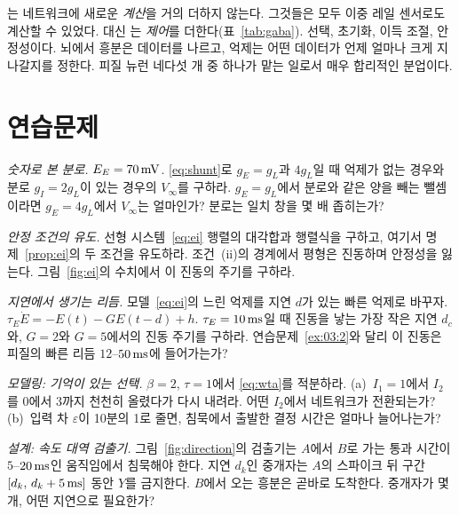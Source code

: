 는 네트워크에 새로운 \emph{계산}을 거의 더하지 않는다. 그것들은 모두 이중 레일 센서로도 계산할 수 있었다. 대신 는 \emph{제어}를 더한다(표~\ref{tab:gaba}). 선택, 초기화, 이득 조절, 안정성이다. 뇌에서 흥분은 데이터를 나르고, 억제는 어떤 데이터가 언제 얼마나 크게 지나갈지를 정한다. 피질 뉴런 네다섯 개 중 하나가 맡는 일로서 매우 합리적인 분업이다.

\section{연습문제}

\begin{exercise}[\lvlA]
\label{ex:03:1}
\emph{숫자로 본 분로.} $E_E=70\,\text{mV}$. \eqref{eq:shunt}로 $g_E=g_L$과 $4g_L$일 때 억제가 없는 경우와 분로 $g_I=2g_L$이 있는 경우의 $V_\infty$를 구하라. $g_E=g_L$에서 분로와 같은 양을 빼는 뺄셈이라면 $g_E=4g_L$에서 $V_\infty$는 얼마인가? 분로는 일치 창을 몇 배 좁히는가?
\end{exercise}

\begin{exercise}[\lvlB]
\label{ex:03:2}
\emph{안정 조건의 유도.} 선형 시스템~\eqref{eq:ei} 행렬의 대각합과 행렬식을 구하고, 여기서 명제~\ref{prop:ei}의 두 조건을 유도하라. 조건~(ii)의 경계에서 평형은 진동하며 안정성을 잃는다. 그림~\ref{fig:ei}의 수치에서 이 진동의 주기를 구하라.
\end{exercise}

\begin{exercise}[\lvlB]
\label{ex:03:3}
\emph{지연에서 생기는 리듬.} 모델~\eqref{eq:ei}의 느린 억제를 지연 $d$가 있는 빠른 억제로 바꾸자. $\tau_E\dot E=-E(t)-GE(t-d)+h$. $\tau_E=10\,\text{ms}$일 때 진동을 낳는 가장 작은 지연 $d_c$와, $G=2$와 $G=5$에서의 진동 주기를 구하라. 연습문제~\ref{ex:03:2}와 달리 이 진동은 피질의 빠른 리듬 $12$--$50\,\text{ms}$에 들어가는가?
\end{exercise}

\begin{exercise}[\lvlB]
\label{ex:03:4}
\emph{모델링: 기억이 있는 선택.} $\beta=2$, $\tau=1$에서 \eqref{eq:wta}를 적분하라. (a)~$I_1=1$에서 $I_2$를 $0$에서 $3$까지 천천히 올렸다가 다시 내려라. 어떤 $I_2$에서 네트워크가 전환되는가? (b)~입력 차 $\varepsilon$이 10분의 1로 줄면, 침묵에서 출발한 결정 시간은 얼마나 늘어나는가?
\end{exercise}

\begin{exercise}[\lvlB]
\label{ex:03:5}
\emph{설계: 속도 대역 검출기.} 그림~\ref{fig:direction}의 검출기는 $A$에서 $B$로 가는 통과 시간이 $5$--$20\,\text{ms}$인 움직임에서 침묵해야 한다. 지연 $d_k$인  중개자는 $A$의 스파이크 뒤 구간 $[d_k,\,d_k+5\,\text{ms}]$ 동안 $Y$를 금지한다. $B$에서 오는 흥분은 곧바로 도착한다. 중개자가 몇 개, 어떤 지연으로 필요한가?
\end{exercise}


